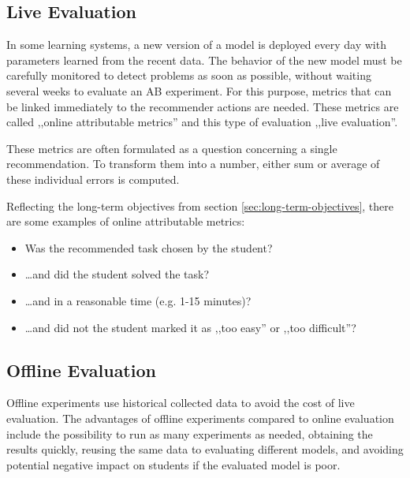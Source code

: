 \subsection{Live Evaluation}

In some learning systems, a new version of a model is deployed every day
  with parameters learned from the recent data.
The behavior of the new model must be carefully monitored
  to detect problems as soon as possible,
  without waiting several weeks to evaluate an AB experiment.
For this purpose, metrics that can be linked immediately
  to the recommender actions are needed.
These metrics are called ,,online attributable metrics''  %
and this type of evaluation ,,live evaluation''.

These metrics are often formulated as a question concerning a single recommendation.
To transform them into a number, either sum or average of these individual errors is computed.

Reflecting the long-term objectives from section \ref{sec:long-term-objectives},
  there are some examples of online attributable metrics:
\begin{itemize}
  \item Was the recommended task chosen by the student?
  \item \ldots and did the student solved the task?
  \item \ldots and in a reasonable time (e.g. 1-15 minutes)?
  \item \ldots and did not the student marked it as ,,too easy'' or ,,too difficult''?
\end{itemize}





\subsection{Offline Evaluation}

Offline experiments use historical collected data
  to avoid the cost of live evaluation.
The advantages of offline experiments compared to online evaluation include
  the possibility to run as many experiments as needed,
  obtaining the results quickly,
  reusing the same data to evaluating different models,
  and avoiding potential negative impact on students if the evaluated model is poor.


